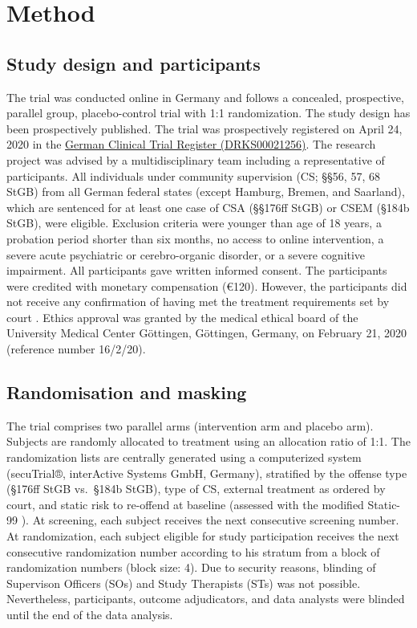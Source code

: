 \documentclass[
  super,
  preprint,
  1p,
  onecolumn]{elsarticle}
\begin{document}
\section{Method}\label{method}

\subsection{Study design and
participants}\label{study-design-and-participants}

The trial was conducted online in Germany and follows a concealed,
prospective, parallel group, placebo-control trial with 1:1
randomization. The study design has been prospectively published.
\citep{frombergerMyTabuAPlaceboControlled2021} The trial was
prospectively registered on April 24, 2020 in the
\href{https://drks.de/search/en/trial/DRKS00021256}{German Clinical
Trial Register (DRKS00021256)}. The research project was advised by a
multidisciplinary team including a representative of participants. All
individuals under community supervision (CS; §§56, 57, 68 StGB) from all
German federal states (except Hamburg, Bremen, and Saarland), which are
sentenced for at least one case of CSA (§§176ff StGB) or CSEM (§184b
StGB), were eligible. Exclusion criteria were younger than age of 18
years, a probation period shorter than six months, no access to online
intervention, a severe acute psychiatric or cerebro-organic disorder, or
a severe cognitive impairment. All participants gave written informed
consent. The participants were credited with monetary compensation
(€120). However, the participants did not receive any confirmation of
having met the treatment requirements set by court . Ethics approval was
granted by the medical ethical board of the University Medical Center
Göttingen, Göttingen, Germany, on February 21, 2020 (reference number
16/2/20).

\subsection{Randomisation and masking}\label{randomisation-and-masking}

The trial comprises two parallel arms (intervention arm and placebo
arm). Subjects are randomly allocated to treatment using an allocation
ratio of 1:1. The randomization lists are centrally generated using a
computerized system (secuTrial®, interActive Systems GmbH, Germany),
stratified by the offense type (§176ff StGB vs.~§184b StGB), type of CS,
external treatment as ordered by court, and static risk to re-offend at
baseline (assessed with the modified Static-99
\citep{setoOnlineSolicitationOffenders2012}). At screening, each subject
receives the next consecutive screening number. At randomization, each
subject eligible for study participation receives the next consecutive
randomization number according to his stratum from a block of
randomization numbers (block size: 4). Due to security reasons, blinding
of Supervison Officers (SOs) and Study Therapists (STs) was not
possible. Nevertheless, participants, outcome adjudicators, and data
analysts were blinded until the end of the data analysis.
\end{document}
